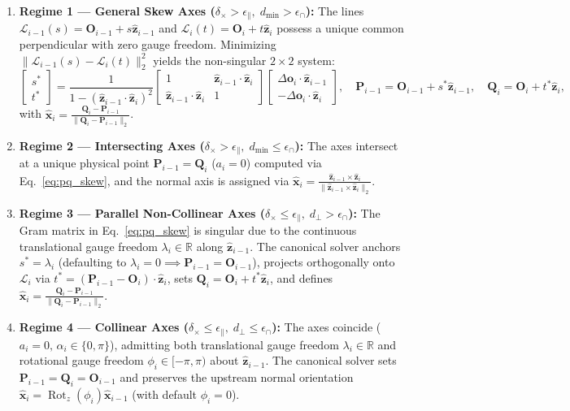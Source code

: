 \documentclass[fleqn,10pt]{article}
\begin{document}
	\begin{enumerate}
		\item \textbf{Regime 1 --- General Skew Axes ($\delta_\times > \epsilon_\parallel, \; d_{\min} > \epsilon_\cap$):} The lines $\mathcal{L}_{i-1}(s) = \bm{O}_{i-1} + s\hat{\bm{z}}_{i-1}$ and $\mathcal{L}_i(t) = \bm{O}_i + t\hat{\bm{z}}_i$ possess a unique common perpendicular with zero gauge freedom. Minimizing $\|\mathcal{L}_{i-1}(s) - \mathcal{L}_i(t)\|_2^2$ yields the non-singular $2 \times 2$ system:
		\begin{equation}
			\begin{bmatrix} s^* \\ t^* \end{bmatrix} = \frac{1}{1 - (\hat{\bm{z}}_{i-1} \cdot \hat{\bm{z}}_i)^2} \begin{bmatrix} 1 & \hat{\bm{z}}_{i-1} \cdot \hat{\bm{z}}_i \\ \hat{\bm{z}}_{i-1} \cdot \hat{\bm{z}}_i & 1 \end{bmatrix} \begin{bmatrix} \Delta \bm{o}_i \cdot \hat{\bm{z}}_{i-1} \\ -\Delta \bm{o}_i \cdot \hat{\bm{z}}_i \end{bmatrix}, \quad \bm{P}_{i-1} = \bm{O}_{i-1} + s^*\hat{\bm{z}}_{i-1}, \quad \bm{Q}_i = \bm{O}_i + t^*\hat{\bm{z}}_i,
			\label{eq:pq_skew}
		\end{equation}
		with $\hat{\bm{x}}_i = \frac{\bm{Q}_i - \bm{P}_{i-1}}{\|\bm{Q}_i - \bm{P}_{i-1}\|_2}$.
		\item \textbf{Regime 2 --- Intersecting Axes ($\delta_\times > \epsilon_\parallel, \; d_{\min} \le \epsilon_\cap$):} The axes intersect at a unique physical point $\bm{P}_{i-1} = \bm{Q}_i$ ($a_i = 0$) computed via Eq.~\eqref{eq:pq_skew}, and the normal axis is assigned via $\hat{\bm{x}}_i = \frac{\hat{\bm{z}}_{i-1} \times \hat{\bm{z}}_i}{\|\hat{\bm{z}}_{i-1} \times \hat{\bm{z}}_i\|_2}$.
		\item \textbf{Regime 3 --- Parallel Non-Collinear Axes ($\delta_\times \le \epsilon_\parallel, \; d_\perp > \epsilon_\cap$):} The Gram matrix in Eq.~\eqref{eq:pq_skew} is singular due to the continuous translational gauge freedom $\lambda_i \in \mathbb{R}$ along $\hat{\bm{z}}_{i-1}$. The canonical solver anchors $s^* = \lambda_i$ (defaulting to $\lambda_i = 0 \implies \bm{P}_{i-1} = \bm{O}_{i-1}$), projects orthogonally onto $\mathcal{L}_i$ via $t^* = (\bm{P}_{i-1} - \bm{O}_i) \cdot \hat{\bm{z}}_i$, sets $\bm{Q}_i = \bm{O}_i + t^*\hat{\bm{z}}_i$, and defines $\hat{\bm{x}}_i = \frac{\bm{Q}_i - \bm{P}_{i-1}}{\|\bm{Q}_i - \bm{P}_{i-1}\|_2}$.
		\item \textbf{Regime 4 --- Collinear Axes ($\delta_\times \le \epsilon_\parallel, \; d_\perp \le \epsilon_\cap$):} The axes coincide ($a_i = 0, \, \alpha_i \in \{0, \pi\}$), admitting both translational gauge freedom $\lambda_i \in \mathbb{R}$ and rotational gauge freedom $\phi_i \in [-\pi, \pi)$ about $\hat{\bm{z}}_{i-1}$. The canonical solver sets $\bm{P}_{i-1} = \bm{Q}_i = \bm{O}_{i-1}$ and preserves the upstream normal orientation $\hat{\bm{x}}_i = \operatorname{Rot}_z(\phi_i)\hat{\bm{x}}_{i-1}$ (with default $\phi_i = 0$).
	\end{enumerate}
	
\end{document}
